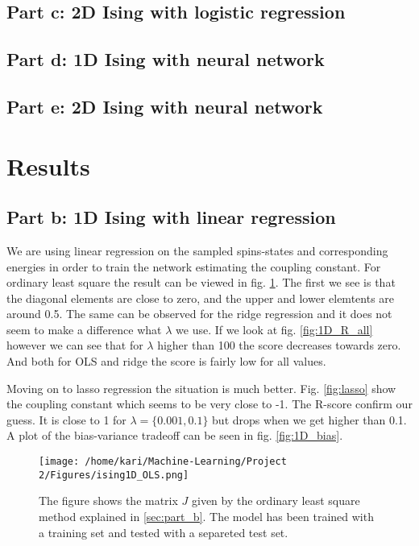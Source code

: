 \documentclass[a4paper,12pt, english]{article}
\begin{document}
\subsection{Part c: 2D Ising with logistic regression}

\subsection{Part d: 1D Ising with neural network}

\subsection{Part e: 2D Ising with neural network}


\section{Results}

\subsection{Part b: 1D Ising with linear regression}

We are using linear regression on the sampled spins-states and corresponding energies in order to train the network estimating the coupling constant. For ordinary least square the result can be viewed in fig. \ref{fig:OLS}. The first we see is that the diagonal elements are close to zero, and the upper and lower elemtents are around 0.5. The same can be observed for the ridge regression and it does not seem to make a difference what $\lambda$ we use. If we look at fig. \ref{fig:1D_R_all} however we can see that for $\lambda$ higher than 100 the score decreases towards zero. And both for OLS and ridge the score is fairly low for all values. 

Moving on to lasso regression the situation is much better. Fig. \ref{fig:lasso} show the coupling constant which seems to be very close to -1. The R-score confirm our guess. It is close to 1 for $\lambda = \{0.001, 0.1\}$ but drops when we get higher than 0.1. A plot of the bias-variance tradeoff can be seen in fig. \ref{fig:1D_bias}. 

\begin{figure} \label{fig:OLS}
\centering
\texttt{[image: /home/kari/Machine-Learning/Project 2/Figures/ising1D\_OLS.png]}
\caption{The figure shows the matrix $J$ given by the ordinary least square method explained in \ref{sec:part_b}. The model has been trained with a training set and tested with a separeted test set.} 
\label{fig:OLS}
\end{figure}
\end{document}
